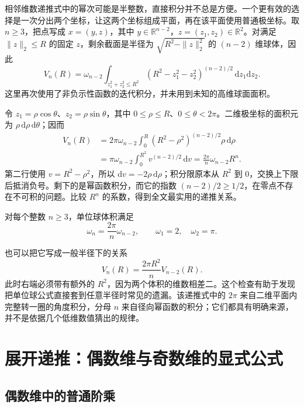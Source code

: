 \documentclass[UTF8]{ctexart}
\begin{document}
相邻维数递推式中的幂次可能是半整数，直接积分并不总是方便。一个更有效的选择是一次分出两个坐标，让这两个坐标组成平面，再在该平面使用普通极坐标。取 $n\geq3$，把点写成 $x=(y,z)$，其中 $y\in\mathbb R^{n-2}$，$z=(z_1,z_2)\in\mathbb R^2$。对满足 $\|z\|_2\leq R$ 的固定 $z$，剩余截面是半径为 $\sqrt{R^2-\|z\|_2^2}$ 的 $(n-2)$ 维球体，因此
\[
  V_n(R)=\omega_{n-2}\int_{z_1^2+z_2^2\leq R^2}
  (R^2-z_1^2-z_2^2)^{(n-2)/2}\,\mathrm dz_1\mathrm dz_2.
\]
这里再次使用了非负示性函数的迭代积分，并未用到未知的高维球面面积。

令 $z_1=\rho\cos\theta$、$z_2=\rho\sin\theta$，其中 $0\leq\rho\leq R$、$0\leq\theta<2\pi$。二维极坐标的面积元为 $\rho\,\mathrm d\rho\,\mathrm d\theta$；因而
\begin{align*}
  V_n(R)
  &=2\pi\omega_{n-2}\int_0^R
    (R^2-\rho^2)^{(n-2)/2}\rho\,\mathrm d\rho\\
  &=\pi\omega_{n-2}\int_0^{R^2}v^{(n-2)/2}\,\mathrm dv
    =\frac{2\pi}{n}\omega_{n-2}R^n.
\end{align*}
第二行使用 $v=R^2-\rho^2$，所以 $\mathrm dv=-2\rho\,\mathrm d\rho$；积分限原本从 $R^2$ 到 $0$，交换上下限后抵消负号。剩下的是幂函数积分，而它的指数 $(n-2)/2\geq1/2$，在零点不存在不可积的问题。比较 $R^n$ 的系数，得到全文最实用的递推关系。

\begin{proposition}[隔两维的体积递推]\label{prop:nb-recurrence}
对每个整数 $n\geq3$，单位球体积满足
\begin{equation}\label{eq:nb-recurrence}
  \boxed{\omega_n=\frac{2\pi}{n}\omega_{n-2}},
  \qquad \omega_1=2,\quad\omega_2=\pi.
\end{equation}
\end{proposition}

也可以把它写成一般半径下的关系
\[
  V_n(R)=\frac{2\pi R^2}{n}V_{n-2}(R).
\]
此时右端必须带有额外的 $R^2$，因为两个体积的维数相差二。这个检查有助于发现把单位球公式直接套到任意半径时常见的遗漏。该递推式中的 $2\pi$ 来自二维平面内完整转一圈的角度积分，分母 $n$ 来自径向幂函数的积分；它们都具有明确来源，并不是依据几个低维数值猜出的规律。

\section{展开递推：偶数维与奇数维的显式公式}
\label{sec:nb-parity}

\subsection{偶数维中的普通阶乘}
\end{document}
